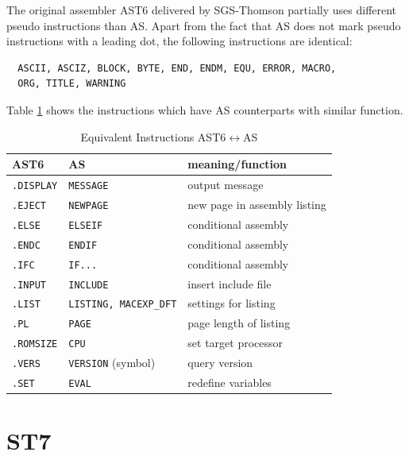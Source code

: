 \documentclass[12pt,twoside]{report}
\newcommand{\tty}[1]{{\tt #1}}
\newcommand{\asname}{{AS}}
\begin{document}
The original assembler AST6 delivered by SGS-Thomson partially uses
different pseudo instructions than \asname{}.  Apart from the fact that \asname{}
does not mark pseudo instructions with a leading dot, the following
instructions are identical:
\begin{verbatim}
  ASCII, ASCIZ, BLOCK, BYTE, END, ENDM, EQU, ERROR, MACRO,
  ORG, TITLE, WARNING
\end{verbatim}
Table \ref{TabAST6} shows the instructions which have \asname{} counterparts
with similar function.
\par
\begin{table}[htbp]
\begin{center}\begin{tabular}{|l|l|l|}
\hline
AST6            & \asname{}                     & meaning/function \\
\hline
\hline
\tty{.DISPLAY}  & \tty{MESSAGE}          & output message \\
\hline
\tty{.EJECT}    & \tty{NEWPAGE}          & new page in assembly listing \\
\hline
\tty{.ELSE}     & \tty{ELSEIF}           & conditional assembly \\
\hline
\tty{.ENDC}     & \tty{ENDIF}            & conditional assembly \\
\hline
\tty{.IFC}      & \tty{IF...}            & conditional assembly \\
\hline
\tty{.INPUT}    & \tty{INCLUDE}          & insert include file \\
\hline
\tty{.LIST}     & \tty{LISTING, MACEXP\_DFT}  & settings for listing \\
\hline
\tty{.PL}       & \tty{PAGE}             & page length of listing \\
\hline
\tty{.ROMSIZE}  & \tty{CPU}              & set target processor \\
\hline
\tty{.VERS}     & \tty{VERSION} (symbol) & query version \\
\hline
\tty{.SET}      & \tty{EVAL}             & redefine variables \\
\hline
\end{tabular}\end{center}
\caption{Equivalent Instructions AST6$\leftrightarrow$\asname{}\label{TabAST6}}
\end{table}


\section{ST7}
\end{document}
